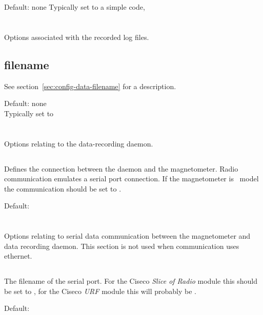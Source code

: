 Default: none
Typically set to a simple code, 

\section{\code{[logfile]}}
Options associated with the recorded log files. 

\subsection{filename}

See section~\ref{sec:config-data-filename} for a description.

Default: none\\
Typically set to 


\section{\code[daemon]}
Options relating to the data-recording daemon.

\subsection{}
Defines the connection between the daemon and the magnetometer. Radio
communication emulates a serial port connection. If the magnetometer
is \PoE\ model the communication should be set to .

Default: 

\section{\code{[serial]}}
Options relating to serial data communication between the magnetometer
and data recording daemon. This section is not used when communication
uses ethernet.

\subsection{}
The filename of the serial port. For the Ciseco \emph{Slice of Radio} module
this should be set to , for the Ciseco
\emph{URF} module this will probably be .

Default: 

